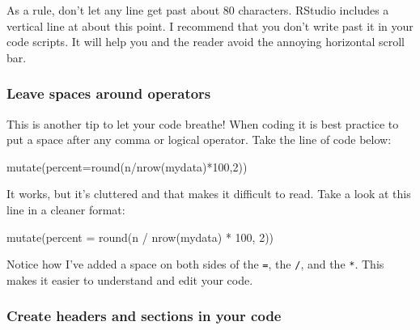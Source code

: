 \documentclass[
]{book}
\newenvironment{Shaded}{\begin{snugshade}}{\end{snugshade}}
\newcommand{\AttributeTok}[1]{\textcolor[rgb]{0.77,0.63,0.00}{#1}}
\newcommand{\DecValTok}[1]{\textcolor[rgb]{0.00,0.00,0.81}{#1}}
\newcommand{\FunctionTok}[1]{\textcolor[rgb]{0.00,0.00,0.00}{#1}}
\newcommand{\NormalTok}[1]{#1}
\newcommand{\SpecialCharTok}[1]{\textcolor[rgb]{0.00,0.00,0.00}{#1}}
\begin{document}
As a rule, don't let any line get past about 80 characters. RStudio includes a
vertical line at about this point. I recommend that you don't write past it in
your code scripts. It will help you and the reader avoid the annoying horizontal scroll bar.

\hypertarget{leave-spaces-around-operators-1}{%
\subsubsection*{Leave spaces around operators}\label{leave-spaces-around-operators-1}}

This is another tip to let your code breathe! When coding it is best practice to
put a space after any comma or logical operator. Take the line of code below:

\begin{Shaded}
\begin{Highlighting}[]
\FunctionTok{mutate}\NormalTok{(}\AttributeTok{percent=}\FunctionTok{round}\NormalTok{(n}\SpecialCharTok{/}\FunctionTok{nrow}\NormalTok{(mydata)}\SpecialCharTok{*}\DecValTok{100}\NormalTok{,}\DecValTok{2}\NormalTok{))}
\end{Highlighting}
\end{Shaded}

It works, but it's cluttered and that makes it difficult to read. Take a look at this
line in a cleaner format:

\begin{Shaded}
\begin{Highlighting}[]
\FunctionTok{mutate}\NormalTok{(}\AttributeTok{percent =} \FunctionTok{round}\NormalTok{(n }\SpecialCharTok{/} \FunctionTok{nrow}\NormalTok{(mydata) }\SpecialCharTok{*} \DecValTok{100}\NormalTok{, }\DecValTok{2}\NormalTok{))}
\end{Highlighting}
\end{Shaded}

Notice how I've added a space on both sides of the \texttt{=}, the \texttt{/}, and the \texttt{*}. This makes it easier to understand and edit your code.

\hypertarget{create-headers-and-sections-in-your-code-1}{%
\subsubsection*{Create headers and sections in your code}\label{create-headers-and-sections-in-your-code-1}}
\end{document}
